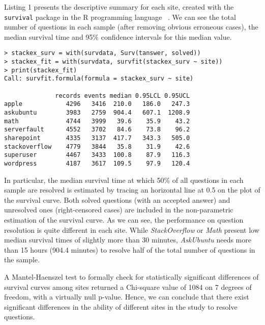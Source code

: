 \documentclass{chi2012}
\begin{document}
Listing 1 presents the descriptive summary for each site, created
with the \texttt{survival} package in the R programming language ~\cite{survival-package}.
We can see the total number of questions in each sample (after removing 
obvious erroneous cases), the median survival time and 95\% 
confidence intervals for this median value.

\begin{lstlisting}[breaklines=true,
caption={Summary of number of events (solved questions), median 
survival time (in minutes) and its associated 95\% confidence interval 
for each site.},
basicstyle=\ttfamily\scriptsize,
frame=lines,
showtabs=false,
showspaces=false,
showstringspaces=false,
captionpos=b]
> stackex_surv = with(survdata, Surv(tanswer, solved))
> stackex_fit = with(survdata, survfit(stackex_surv ~ site))
> print(stackex_fit)
Call: survfit.formula(formula = stackex_surv ~ site)

              records events median 0.95LCL 0.95UCL
apple            4296   3416  210.0   186.0   247.3
askubuntu        3983   2759  904.4   607.1  1208.9
math             4744   3999   39.6    35.9    43.2
serverfault      4552   3702   84.6    73.8    96.2
sharepoint       4335   3137  417.7   343.3   505.0
stackoverflow    4779   3844   35.8    31.9    42.6
superuser        4467   3433  100.8    87.9   116.3
wordpress        4187   3617  109.5    97.9   120.4
\end{lstlisting}

In particular, the median survival time at which 50\% of all questions in 
each sample are resolved is
estimated by tracing an horizontal line at 0.5 on the plot of the survival curve. 
Both solved questions (with an accepted answer) and unresolved ones (right-censored 
cases) are included in the non-parametric estimation of the survival curve. As we
can see, the performance on question resolution is quite different in each site.
While \textit{StackOverflow} or \textit{Math} present low median survival
times of slightly more than 30 minutes, \textit{AskUbuntu} needs more than
15 hours (904.4 minutes) to resolve half of the total number of questions in the
sample.

A Mantel-Haenszel test \cite{mantel1959} to formally check for statistically
significant differences of survival curves among sites returned a Chi-square value
of 1084 on 7 degrees of freedom, with a virtually null p-value. Hence, we can conclude
that there exist significant differences in the ability of different sites in the
study to resolve questions. 
\end{document}
